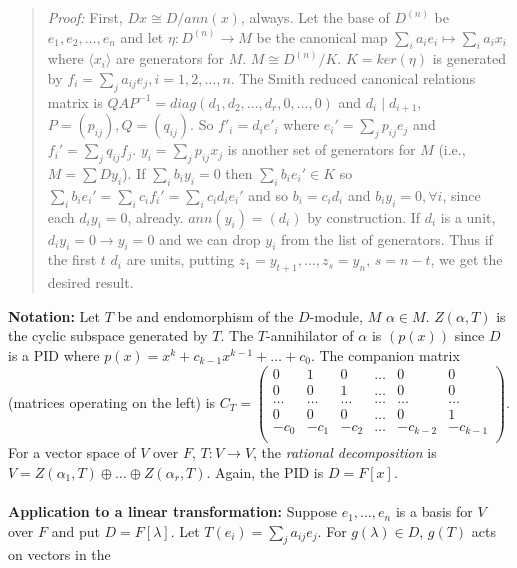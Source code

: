\begin{quote}
\emph{Proof:} 
First, $Dx \cong D/ann(x)$, always.
Let the base of $D^{(n)}$ be $e_{1}, e_{2}, \ldots , e_{n}$ and let
$\eta: D^{(n)} \rightarrow M$ be the canonical map
$\sum_i a_i e_i \mapsto \sum_i a_i x_i$ where $\langle x_i \rangle$ are generators
for $M$.  $M \cong D^{(n)}/K$. $K= ker(\eta)$ is generated by 
$f_{i}= \sum_j a_{ij} e_{j}, i= 1, 2, \ldots , n$.  
The Smith reduced canonical relations matrix is
$QAP^{-1}= diag(d_{1}, d_{2}, ..., d_{r}, 0, \ldots, 0 )$ and $d_{i} \mid d_{i+1}$,
$P=(p_{ij}), Q= (q_{ij})$.
So $f'_{i}= d_{i} e'_{i}$ where $e_i'= \sum_j p_{ij} e_j$ and 
$f_i'= \sum_j q_{ij} f_j$. 
$y_i= \sum_j p_{ij} x_j$ is another set of generators for $M$ (i.e.,
$M= \sum D y_i$).  If $\sum_i b_i y_{i}=0$ then $\sum_i b_i e_i' \in K$ so
$\sum_i b_i e_i' = \sum_i c_i f_i'= \sum_i c_i d_i e_i'$ and so $b_i = c_i d_i$ and 
$b_i y_i=0, \forall i$, since each $d_i y_i= 0$, already.
$ann(y_{i})= (d_{i})$ by construction.  If $d_{i}$ is a unit, $d_i y_i= 0 \rightarrow y_i= 0$ 
and we can drop $y_i$ from the list of generators.  Thus if the first $t$ $d_i$ are units,
putting $z_{1}= y_{t+1} , \ldots, z_{s}= y_{n}$, $s= n-t$, we get the desired result.
\end{quote}
{\bf Notation:}  Let $T$ be and endomorphism of the $D$-module, $M$ $\alpha \in M$.
$Z(\alpha, T)$ is the cyclic subspace generated by $T$.  The $T$-annihilator
of $\alpha$ is $(p(x))$ since $D$ is a PID where
$p(x)= x^k + c_{k-1} x^{k-1} + \ldots + c_0$.  
The companion matrix (matrices operating on the left) is $C_T=
\left(
\begin{array}{cccccc}
0 & 1 & 0 & \ldots & 0 & 0\\
0 & 0 & 1 & \ldots & 0 & 0\\
\ldots & \ldots & \ldots & \ldots & \ldots & \ldots \\
0 & 0 & 0 & \ldots & 0 & 1\\
-c_0 & -c_1 & -c_2 & \ldots & -c_{k-2} & -c_{k-1}\\
\end{array}
\right)$.
For a vector space of $V$ over $F$, $T: V \rightarrow V$,
the \emph{rational decomposition}
is $V= Z(\alpha_1, T) \oplus \ldots \oplus Z(\alpha_r, T)$.  Again, the PID is $D= F[x]$.
\\
\\
{\bf Application to a linear transformation:} Suppose 
$e_1, \ldots, e_n$ is a basis for $V$ over $F$ and put $D= F[\lambda]$.  Let 
$T(e_i) = \sum_j a_{ij} e_j$.  For $g(\lambda) \in D$, $g(T)$ acts on vectors in the

